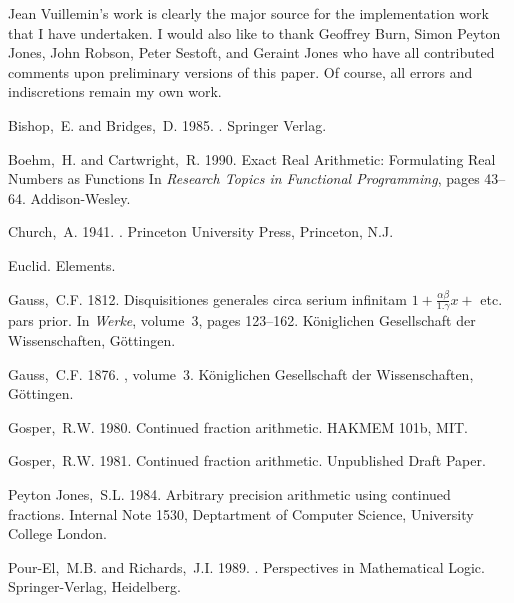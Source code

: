 Jean Vuillemin's work  is clearly the major
source for the implementation work that I have undertaken. I would
also like to thank Geoffrey Burn, Simon Peyton Jones, John Robson,
Peter Sestoft, and Geraint Jones who have all contributed comments
upon preliminary versions of this paper. Of course, all errors and
indiscretions remain my own work.

\begin{thebibliography}{}

Bishop,~E. and Bridges,~D. 1985.
.
\newblock Springer Verlag.

Boehm,~H. and Cartwright,~R. 1990.
\newblock Exact Real Arithmetic: Formulating Real Numbers as Functions
\newblock In {\em Research Topics in Functional Programming}, pages 43--64.
  Addison-Wesley.

Church,~A. 1941.
.
\newblock Princeton University Press, Princeton, N.J.

Euclid.
\newblock Elements.

Gauss,~C.F. 1812.
\newblock Disquisitiones generales circa serium infinitam
  $1+\frac{\alpha\beta}{1.\gamma}x + $ etc. pars prior.
\newblock In {\em Werke}, volume~3, pages 123--162. K\"{o}niglichen
  Gesellschaft der Wissenschaften, G\"{o}ttingen.

Gauss,~C.F. 1876.
, volume~3.
\newblock K\"{o}niglichen Gesellschaft der Wissenschaften, G\"{o}ttingen.

Gosper,~R.W. 1980.
\newblock Continued fraction arithmetic.
\newblock HAKMEM 101b, MIT.

Gosper,~R.W. 1981.
\newblock Continued fraction arithmetic.
\newblock Unpublished Draft Paper.

{Peyton Jones},~S.L. 1984.
\newblock Arbitrary precision arithmetic using continued fractions.
\newblock Internal Note 1530, Deptartment of Computer Science, University
  College London.

{Pour-El},~M.B. and Richards,~J.I. 1989.
.
\newblock Perspectives in Mathematical Logic. Springer-Verlag, Heidelberg.


\end{thebibliography}
